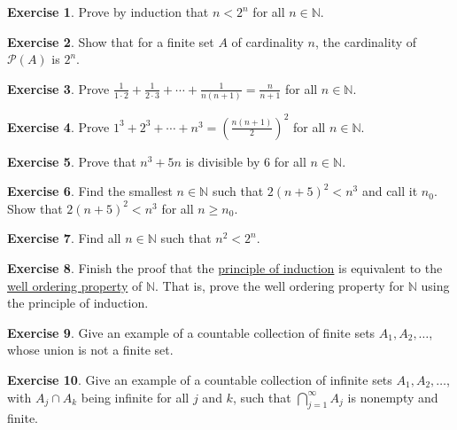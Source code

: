 \documentclass[12pt]{book}
\newcommand{\N}{{\mathbb{N}}}
\newcommand{\sP}{{\mathcal{P}}}
\theoremstyle{plain}
\theoremstyle{remark}
\theoremstyle{definition}
\theoremstyle{exercise}
\newtheorem{exercise}{Exercise}[section]
\theoremstyle{example}
\begin{document}
\begin{exercise}
Prove by induction that $n < 2^n$ for all $n \in \N$.
\end{exercise}

\begin{exercise}
Show that for a finite set $A$ of cardinality $n$, the cardinality
of $\sP(A)$ is $2^n$.
\end{exercise}

\begin{exercise}
Prove $\frac{1}{1\cdot 2} + 
\frac{1}{2\cdot 3} + \cdots + \frac{1}{n(n+1)} = \frac{n}{n+1}$
for all $n \in \N$.
\end{exercise}

\begin{exercise}
Prove $1^3 + 2^3 + \cdots + n^3 = {\left( \frac{n(n+1)}{2} \right)}^2$
for all $n \in \N$.
\end{exercise}

\begin{exercise}
Prove that $n^3 + 5n$ is divisible by $6$ for all $n \in \N$.
\end{exercise}

\begin{exercise}
Find the smallest $n \in \N$ such that $2{(n+5)}^2 < n^3$ and call it $n_0$.
Show that $2{(n+5)}^2 < n^3$ for all $n \geq n_0$.
\end{exercise}

\begin{exercise}
Find all $n \in \N$ such that $n^2 < 2^n$.
\end{exercise}

\begin{exercise}
Finish the proof that the \hyperref[induction:thm]{principle of induction}
is equivalent to the
\hyperlink{wop:link}{well ordering property} of $\N$.  That is,
prove the well ordering property for $\N$ using the principle of
induction.
\end{exercise}


\begin{exercise}
Give an example of a countable collection of finite sets $A_1, A_2, \ldots$,
whose union is not a finite set.
\end{exercise}

\begin{exercise}
Give an example of a countable collection of infinite sets $A_1, A_2, \ldots$,
with $A_j \cap A_k$ being infinite for all $j$ and $k$, such that
$\bigcap_{j=1}^\infty A_j$
is nonempty and finite.
\end{exercise}
\end{document}
